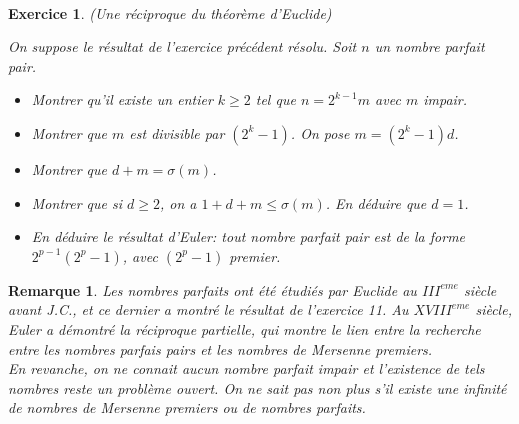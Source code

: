 \documentclass[11pt,a4paper]{article}
\newtheorem{ex}{Exercice}
\newtheorem*{rem}{Remarque}
\begin{document}
\



\begin{ex}(Une réciproque du théorème d'Euclide)\

On suppose le résultat de l'exercice précédent résolu. Soit $n$ un nombre parfait pair.
\begin{itemize}
\item[$1.$] Montrer qu'il existe un entier $k \geqslant 2$ tel que $n=2^{k-1}m$ avec $m$ impair.
\item[$2.$] Montrer que $m$ est divisible par $(2^k-1)$. On pose $m=(2^k-1)d$.
\item[$3.$] Montrer que $d+m=\sigma(m)$.
\item[$4.$] Montrer que si $d \geqslant 2$, on a $1+d+m \leqslant \sigma(m)$. En déduire que $d=1$.
\item[$5.$] En déduire le résultat d'Euler: tout nombre parfait pair est de la forme $2^{p-1}(2^p-1)$, avec $(2^p-1)$ premier.
\end{itemize}
\end{ex}



\begin{rem}
Les nombres parfaits ont été étudiés par Euclide au $III^{eme}$ siècle avant J.C., et ce dernier a montré le résultat de l'exercice 11. Au $XVIII^{eme}$ siècle, Euler a démontré la réciproque partielle, qui montre le lien entre la recherche entre les nombres parfais pairs et les nombres de Mersenne premiers. \\
En revanche, on ne connait aucun nombre parfait impair et l'existence de tels nombres reste un problème ouvert. On ne sait pas non plus s'il existe une infinité de nombres de Mersenne premiers ou de nombres parfaits. 
\end{rem}
\end{document}
